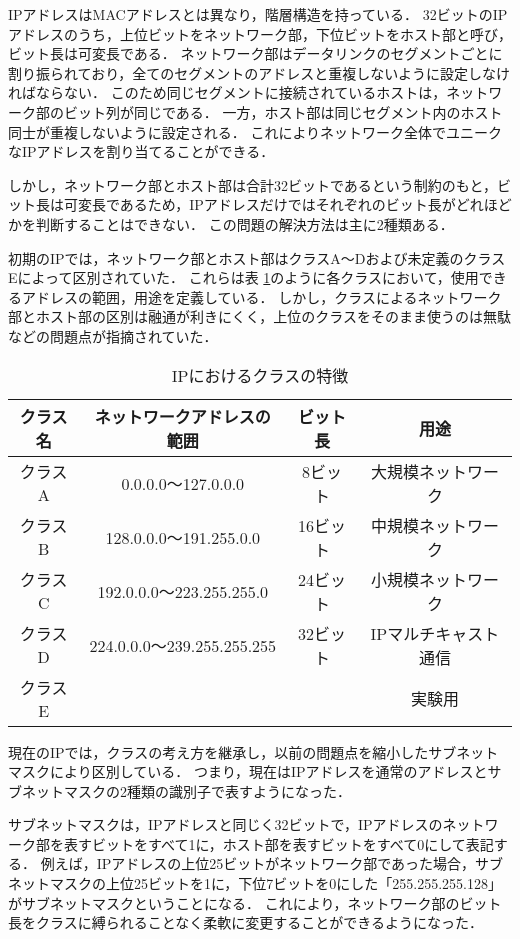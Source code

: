 IPアドレスはMACアドレスとは異なり，階層構造を持っている\cite{masteringtcpip}．
32ビットのIPアドレスのうち，上位ビットをネットワーク部，下位ビットをホスト部と呼び，ビット長は可変長である．
ネットワーク部はデータリンクのセグメントごとに割り振られており，全てのセグメントのアドレスと重複しないように設定しなければならない．
このため同じセグメントに接続されているホストは，ネットワーク部のビット列が同じである．
一方，ホスト部は同じセグメント内のホスト同士が重複しないように設定される．
これによりネットワーク全体でユニークなIPアドレスを割り当てることができる．

しかし，ネットワーク部とホスト部は合計32ビットであるという制約のもと，ビット長は可変長であるため，IPアドレスだけではそれぞれのビット長がどれほどかを判断することはできない．
この問題の解決方法は主に2種類ある．

初期のIPでは，ネットワーク部とホスト部はクラスA～Dおよび未定義のクラスEによって区別されていた．
これらは表 \ref{tab:2-3}のように各クラスにおいて，使用できるアドレスの範囲，用途を定義している．
しかし，クラスによるネットワーク部とホスト部の区別は融通が利きにくく，上位のクラスをそのまま使うのは無駄などの問題点が指摘されていた．

\begin{table}[tb]
	\begin{center}
		\caption{IPにおけるクラスの特徴}
		\begin{tabular}{c|c|c|c}
			\hline \hline
			クラス名 & ネットワークアドレスの範囲 & ビット長 & 用途　\\ \hline
			クラスA & 0.0.0.0～127.0.0.0 & 8ビット & 大規模ネットワーク\\
			クラスB & 128.0.0.0～191.255.0.0 & 16ビット & 中規模ネットワーク \\
			クラスC & 192.0.0.0～223.255.255.0 & 24ビット & 小規模ネットワーク \\
			クラスD & 224.0.0.0～239.255.255.255 & 32ビット & IPマルチキャスト通信\\
			クラスE & & & 実験用　\\ \hline
		\end{tabular}
		\label{tab:2-3}
	\end{center}
\end{table}

現在のIPでは，クラスの考え方を継承し，以前の問題点を縮小したサブネットマスクにより区別している．
つまり，現在はIPアドレスを通常のアドレスとサブネットマスクの2種類の識別子で表すようになった．

サブネットマスクは，IPアドレスと同じく32ビットで，IPアドレスのネットワーク部を表すビットをすべて1に，ホスト部を表すビットをすべて0にして表記する．
例えば，IPアドレスの上位25ビットがネットワーク部であった場合，サブネットマスクの上位25ビットを1に，下位7ビットを0にした「255.255.255.128」がサブネットマスクということになる．
これにより，ネットワーク部のビット長をクラスに縛られることなく柔軟に変更することができるようになった．

